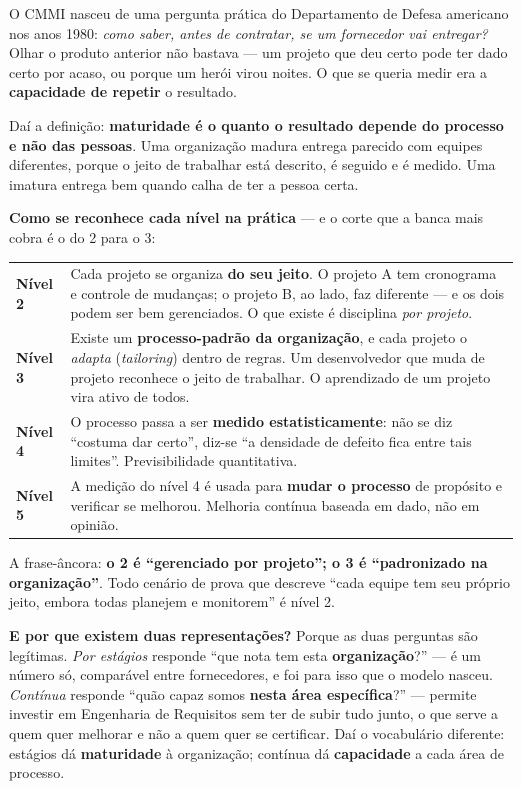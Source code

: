 \begin{conceito}
O CMMI nasceu de uma pergunta prática do Departamento de Defesa americano nos
anos 1980: \emph{como saber, antes de contratar, se um fornecedor vai
entregar?} Olhar o produto anterior não bastava --- um projeto que deu certo
pode ter dado certo por acaso, ou porque um herói virou noites. O que se
queria medir era a \textbf{capacidade de repetir} o resultado.

Daí a definição: \textbf{maturidade é o quanto o resultado depende do processo
e não das pessoas}. Uma organização madura entrega parecido com equipes
diferentes, porque o jeito de trabalhar está descrito, é seguido e é medido.
Uma imatura entrega bem quando calha de ter a pessoa certa.

\textbf{Como se reconhece cada nível na prática} --- e o corte que a banca
mais cobra é o do 2 para o 3:

\begin{center}
\begin{tabular}{@{}p{2cm}p{10.2cm}@{}}
\toprule
\textbf{Nível 2} & Cada projeto se organiza \textbf{do seu jeito}. O projeto A
tem cronograma e controle de mudanças; o projeto B, ao lado, faz diferente ---
e os dois podem ser bem gerenciados. O que existe é disciplina \emph{por
projeto}. \\
\addlinespace
\textbf{Nível 3} & Existe um \textbf{processo-padrão da organização}, e cada
projeto o \emph{adapta} (\emph{tailoring}) dentro de regras. Um desenvolvedor
que muda de projeto reconhece o jeito de trabalhar. O aprendizado de um
projeto vira ativo de todos. \\
\addlinespace
\textbf{Nível 4} & O processo passa a ser \textbf{medido estatisticamente}:
não se diz ``costuma dar certo'', diz-se ``a densidade de defeito fica entre
tais limites''. Previsibilidade quantitativa. \\
\addlinespace
\textbf{Nível 5} & A medição do nível 4 é usada para \textbf{mudar o processo}
de propósito e verificar se melhorou. Melhoria contínua baseada em dado, não
em opinião. \\
\bottomrule
\end{tabular}
\end{center}

A frase-âncora: \textbf{o 2 é ``gerenciado por projeto''; o 3 é ``padronizado
na organização''}. Todo cenário de prova que descreve ``cada equipe tem seu
próprio jeito, embora todas planejem e monitorem'' é nível 2.

\textbf{E por que existem duas representações?} Porque as duas perguntas são
legítimas. \emph{Por estágios} responde ``que nota tem esta
\textbf{organização}?'' --- é um número só, comparável entre fornecedores, e
foi para isso que o modelo nasceu. \emph{Contínua} responde ``quão capaz somos
\textbf{nesta área específica}?'' --- permite investir em Engenharia de
Requisitos sem ter de subir tudo junto, o que serve a quem quer melhorar e não
a quem quer se certificar. Daí o vocabulário diferente: estágios dá
\textbf{maturidade} à organização; contínua dá \textbf{capacidade} a cada área
de processo.
\end{conceito}


